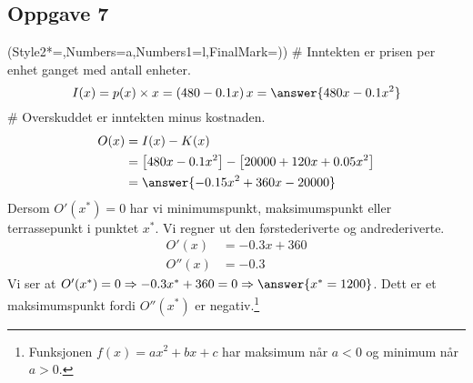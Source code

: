 \subsection*{Oppgave 7}
\begin{easylist}[enumerate]
	\ListProperties(Style2*=,Numbers=a,Numbers1=l,FinalMark={)})
	# Inntekten er prisen per enhet ganget med antall enheter.
	\begin{equation*}
		I(x) = p(x) \times x = \left(480 - 0.1x\right)x = \answer{480x - 0.1x^2}
	\end{equation*}
	# Overskuddet er inntekten minus kostnaden.
	\begin{align*}
		O(x) &= I(x) - K(x) \\
		&= \left[ 480x - 0.1x^2 \right] - \left[20000+120x + 0.05x^2\right] \\
		&= \answer{-0.15x^2 + 360x - 20000}
	\end{align*}
	Dersom $O'(x^*) = 0$ har vi minimumspunkt, maksimumspunkt eller terrassepunkt i punktet $x^*$.
	Vi regner ut den førstederiverte og andrederiverte.
	\begin{align*}
		O'(x) &= -0.3x + 360 \\
		O''(x) &= -0.3
	\end{align*}
	Vi ser at $O'(x^*) = 0 \Rightarrow -0.3x^* + 360 = 0 \Rightarrow  \answer{x^* = 1200}$. Dett er et maksimumspunkt fordi $O''(x^*)$ er negativ.\footnote{Funksjonen $f(x) = ax^2 + bx + c$ har maksimum når $a < 0$ og minimum når $a > 0$.}
	
\end{easylist}

